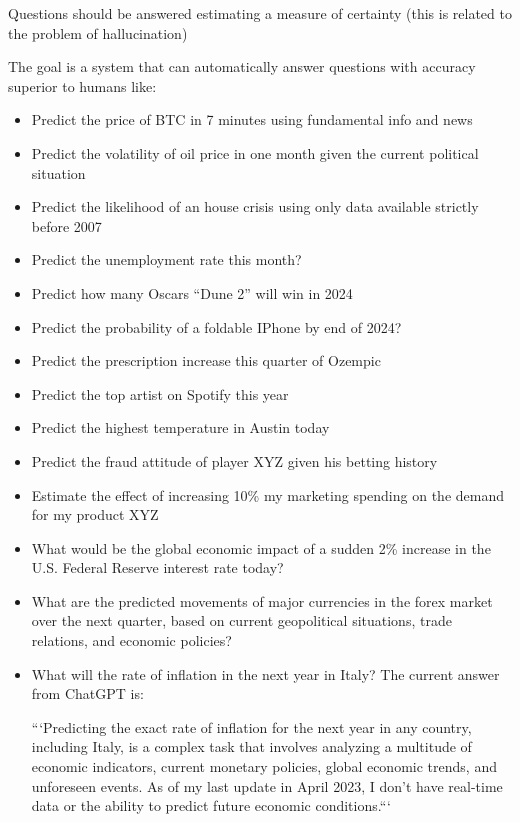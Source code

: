 \documentclass[11pt, reqno]{amsart}
\theoremstyle{definition}
\theoremstyle{remark}
\begin{document}
  Questions should be answered estimating a measure of certainty (this is related
  to the problem of hallucination)

  The goal is a system that can automatically answer questions with accuracy
  superior to humans like:
  \begin{itemize}
    \item Predict the price of BTC in 7 minutes using fundamental info and news
    \item Predict the volatility of oil price in one month given the current political situation
    \item Predict the likelihood of an house crisis using only data available strictly before 2007
    \item Predict the unemployment rate this month?
    \item Predict how many Oscars “Dune 2” will win in 2024
    \item Predict the probability of a foldable IPhone by end of 2024?
    \item Predict the prescription increase this quarter of Ozempic
    \item Predict the top artist on Spotify this year
    \item Predict the highest temperature in Austin today
    \item Predict the fraud attitude of player XYZ given his betting history
    \item Estimate the effect of increasing 10\% my marketing spending on the
      demand for my product XYZ
    \item What would be the global economic impact of a sudden 2\% increase in
      the U.S. Federal Reserve interest rate today?
    \item What are the predicted movements of major currencies in the forex market
      over the next quarter, based on current geopolitical situations, trade relations,
      and economic policies?

    \item What will the rate of inflation in the next year in Italy? The current
      answer from ChatGPT is: 

      ```Predicting the exact rate of inflation for the next year in any
      country, including Italy, is a complex task that involves analyzing a
      multitude of economic indicators, current monetary policies, global
      economic trends, and unforeseen events. As of my last update in April
      2023, I don't have real-time data or the ability to predict future
      economic conditions.```


\end{itemize}
\end{document}
